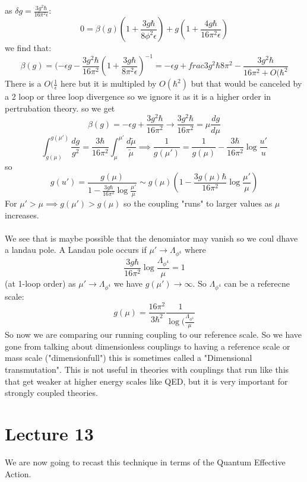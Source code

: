 \documentclass{article}
\begin{document}
        as $\delta g = \frac{3 g^2 \hbar}{16 \pi^2 \epsilon}$:
        $$
        0 = \beta(g) ( 1 + \frac{3 g \hbar}{8 \phi^2 \epsilon}) + g ( 1+ \frac{4 g \hbar}{16 \pi^2 \epsilon})
        $$
        we find that:
        $$
        \beta(g) = ( - \epsilon g - \frac{3 g^2 \hbar}{16 \pi^2} ( 1 + \frac{3 g \hbar}{8 \pi^2 \epsilon})^{-1} = - \epsilon g + frac{3 g^2 \hbar}{8 \pi^2} - \frac{3 g^2 \hbar}{16 \pi^2 + O(\hbar^2}
        $$
        There is a $O(\frac{1}{\epsilon}$ here but it is multipled by $O(\hbar^2)$ but that would be canceled by a 2 loop or three loop divergence so we ignore it as it is a higher order in pertrubation theory. so we get
        $$
        \beta(g) = - \epsilon g + \frac{3 g^2 \hbar}{16 \pi^2 } \rightarrow \frac{3 g^2 \hbar}{16 \pi^2} = \mu \frac{d g}{d\mu}
        $$
        $$
        \int_{g(\mu)}^{g(\mu')} \frac{dg}{g^2} = \frac{3\hbar}{16 \pi^2} \int_{\mu}^{\mu'} \frac{d\tilde \mu}{\tilde \mu} \implies \frac{1}{g(\mu')} = \frac{1}{g(\mu)} - \frac{3 \hbar}{16 \pi^2} \log \frac{u'}{u}
        $$
        so
        $$
        g(u') = \frac{g(\mu)}{1- \frac{3 g \hbar}{16 \pi^2} \log \frac{\mu'}{\mu}} \sim g(\mu) ( 1- \frac{3 g(\mu) \hbar}{16 \pi^2} \log \frac{\mu'}{\mu})
        $$
        For $\mu'> \mu \implies g(\mu') > g(\mu)$ so the coupling "runs" to larger values as $\mu$ increases. \\\\
        We see that is maybe possible that the denomiator may vanish so we coul dhave a landau pole. A Landau pole occurs if $\mu' \rightarrow \Lambda_{\phi^4}$ where 
        $$
        \frac{3 g \hbar}{16 \pi^2} \log \frac{\Lambda_{\phi^4}}{\mu} = 1
        $$
        (at 1-loop order) as $\mu' \rightarrow \Lambda_{\phi^4}$ we have $g(\mu') \rightarrow \infty$. So $\Lambda_{\phi^4}$ can be a referecne scale:
        $$
        g(\mu) = \frac{16 \pi^2}{3 \hbar^2} \frac{1}{\log(\frac{\Lambda_{\phi^4}}{\mu}}
        $$
        So now we are comparing our running coupling to our reference scale. So we have gone from talking about dimensionless couplings to having a reference scale or mass scale ("dimensionfull") this is sometimes called a "Dimensional transmutation". This is not useful in theories with couplings that run like this that get weaker at higher energy scales like QED, but it is very important for strongly coupled theories.
        \section{Lecture 13}
We are now going to recast this technique in terms of the Quantum Effective Action.
\end{document}

